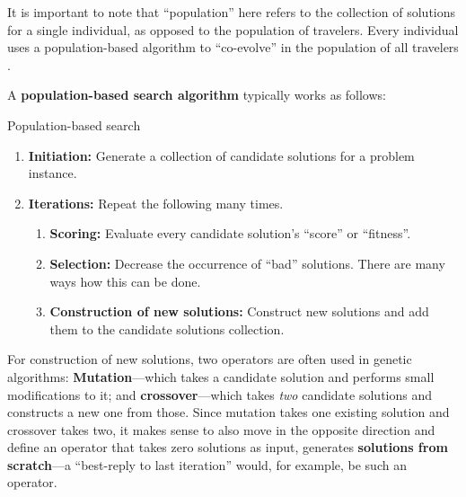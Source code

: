 It is important to note that ``population'' here refers to the
collection of solutions for a single individual, as opposed to the
population of travelers.  Every individual uses a population-based
algorithm to ``co-evolve'' in the population of all
travelers \citep[also see][]{Balmer_PhDThesis_2007}.

A \textbf{population-based search algorithm} typically works as
follows:
\begin{algorithm}[H]

\caption{Population-based search}

\begin{enumerate}

\item \textbf{Initiation:} Generate a collection of candidate
  solutions for a problem instance.

\item \textbf{Iterations:} Repeat the following many times.

\begin{enumerate}

\item \textbf{Scoring:} Evaluate every candidate solution's ``score''
  or ``fitness''.

\item \textbf{Selection:} Decrease the occurrence of ``bad''
  solutions.  There are many ways how this can be done.

\item \textbf{Construction of new solutions:} Construct new solutions
  and add them to the candidate solutions collection.

\end{enumerate}

\end{enumerate}

\end{algorithm}

For  construction of new solutions, two operators are often
used in genetic algorithms: \textbf{Mutation}---which takes a
candidate solution and performs small modifications to it; and
\textbf{crossover}---which takes \emph{two} candidate solutions and
constructs a new one from those.  Since mutation takes one existing
solution and crossover takes two, it makes sense to also move in the
opposite direction and define an operator that takes zero solutions as
input, \ie generates \textbf{solutions from scratch}---a
``best-reply to last iteration'' would, for example, be such an
operator.

